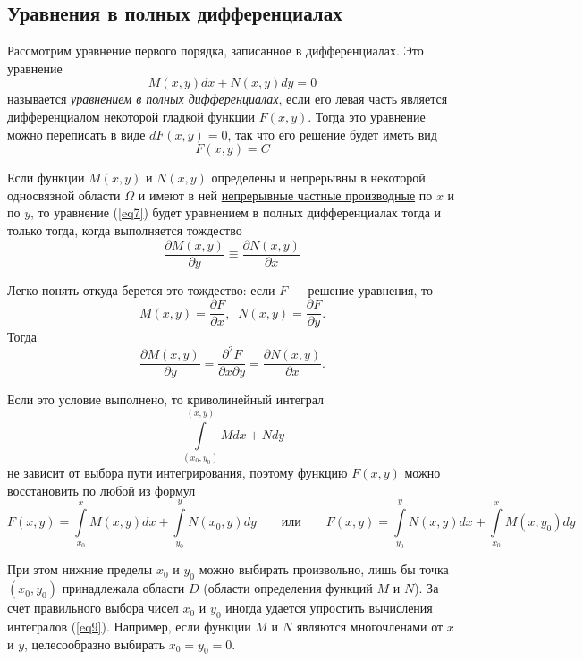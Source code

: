 \subsection*{Уравнения в полных дифференциалах}
Рассмотрим уравнение первого порядка, записанное в дифференциалах. Это уравнение
\begin{equation}\label{eq7}
    M(x, y) dx + N(x, y) dy = 0
\end{equation}
называется \textit{уравнением в полных дифференциалах}, если его левая часть является дифференциалом некоторой гладкой функции $F(x, y)$. 
Тогда это уравнение
можно переписать в виде $dF(x, y) = 0$, так что его решение будет иметь вид
\begin{equation*}
    F(x, y) = C
\end{equation*}

\Statement Если функции $M(x, y)$ и $N(x, y)$ определены и непрерывны в некоторой односвязной области $\Omega$ и имеют в ней \underline{непрерывные частные производные} по $x$ и по $y$, то уравнение (\ref{eq7}) будет уравнением в полных дифференциалах тогда и только тогда, когда выполняется тождество
\begin{equation}\label{eq8}
    \frac{\partial M(x,y)}{\partial y} \equiv \frac{\partial N(x,y)}{\partial x}
\end{equation}

Легко понять откуда берется это тождество: если $F$ — решение уравнения, то 
\[
M(x, y) = \frac{\partial F}{\partial x}, \;\; N(x, y) = \frac{\partial F}{\partial y}.
\]
Тогда 
\[
\frac{\partial M(x,y)}{\partial y} =  \frac{\partial^2 F}{\partial x \partial y} = \frac{\partial N(x,y)}{\partial x}.
\]

Если это условие выполнено, то криволинейный интеграл
\begin{equation*}
    \int\limits_{(x_0, y_0)}^{(x,y)}M dx + N dy
\end{equation*}
не зависит от выбора пути интегрирования, поэтому функцию $F(x, y)$ можно восстановить по любой из формул
\begin{equation}\label{eq9}
    F(x, y) = \int\limits_{x_0}^xM(x, y) dx + \int\limits_{y_0}^yN(x_0, y) dy \qquad \text{или} \qquad F(x, y) = \int\limits_{y_0}^yN(x, y) dx + \int\limits_{x_0}^xM(x, y_0) dy
\end{equation}

При этом нижние пределы $x_0$ и $y_0$ можно выбирать произвольно, лишь бы точка $(x_0, y_0)$ принадлежала области $D$ (области определения функций $M$
и $N$). За счет правильного выбора чисел $x_0$ и $y_0$ иногда удается упростить
вычисления интегралов (\ref{eq9}). Например, если функции $M$ и $N$ являются многочленами от $x$ и $y$, целесообразно выбирать $x_0 = y_0 = 0$.

